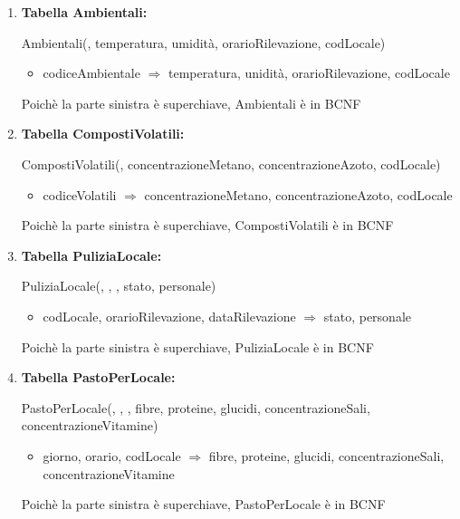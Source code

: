 \documentclass[12pt,a4paper]{article}
\begin{document}
\begin{enumerate}
\item[] \textbf{Tabella Ambientali:}

Ambientali(\underline{}, temperatura, umidità,  orarioRilevazione,  codLocale)
\begin{itemize}
\vspace{-5pt}
\item codiceAmbientale $\Rightarrow$ temperatura, unidità, orarioRilevazione, codLocale
\vspace{-5pt}
\end{itemize}
Poichè la parte sinistra è superchiave, Ambientali è in BCNF
\vspace{10pt}



\item[] \textbf{Tabella CompostiVolatili:}

CompostiVolatili(\underline{}, concentrazioneMetano, concentrazioneAzoto,  codLocale)
\begin{itemize}
\vspace{-5pt}
\item codiceVolatili $\Rightarrow$ concentrazioneMetano, concentrazioneAzoto, codLocale
\vspace{-5pt}
\end{itemize}
Poichè la parte sinistra è superchiave, CompostiVolatili è in BCNF
\vspace{10pt}



\item[] \textbf{Tabella PuliziaLocale:}

PuliziaLocale(\underline{}, \underline{}, \underline{}, stato, personale)
\begin{itemize}
\vspace{-5pt}
\item codLocale, orarioRilevazione, dataRilevazione $\Rightarrow$ stato, personale
\vspace{-5pt}
\end{itemize}
Poichè la parte sinistra è superchiave, PuliziaLocale è in BCNF
\vspace{10pt}



\item[] \textbf{Tabella PastoPerLocale:}

PastoPerLocale(\underline{}, \underline{},  \underline{},  fibre,  proteine,  glucidi,  concentrazioneSali,  concentrazioneVitamine)
\begin{itemize}
\vspace{-5pt}
\item giorno, orario, codLocale $\Rightarrow$ fibre, proteine, glucidi, concentrazioneSali, concentrazioneVitamine
\vspace{-5pt}
\end{itemize}
Poichè la parte sinistra è superchiave, PastoPerLocale è in BCNF
\vspace{10pt}




\end{enumerate}
\end{document}
